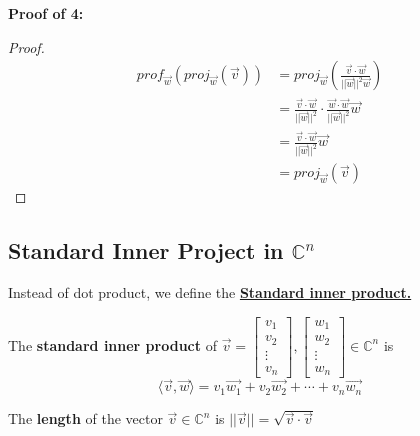 \documentclass[11pt]{article}
\theoremstyle{plain}
\theoremstyle{remark}
\theoremstyle{plain}
\newcommand{\bd}{\textbf}
\begin{document}
\bd{Proof of 4:}
\begin{proof}
\begin{align*}
    prof_{\overrightarrow{w}}(proj_{\overrightarrow{w}}(\overrightarrow{v})) &= proj_{\overrightarrow{w}}(\frac{\overrightarrow{v}\cdot\overrightarrow{w}}{||\overrightarrow{w}||^2\overrightarrow{w}}) \\
    &=\frac{\overrightarrow{v}\cdot \overrightarrow{w}}{||\overrightarrow{w}||^2}\cdot \frac{\overrightarrow{w}\cdot\overrightarrow{w}}{||\overrightarrow{w}||^2}\overrightarrow{w} \\
    &=\frac{\overrightarrow{v}\cdot\overrightarrow{w}}{||\overrightarrow{w}||^2}\overrightarrow{w} \\
    &=proj_{\overrightarrow{w}}(\overrightarrow{v})
\end{align*}
\end{proof}

\subsection*{Standard Inner Project in $\mathbb{C}^n$}
Instead of dot product, we define the \underline{\bd{Standard inner product.}}

\begin{tcolorbox}[colback=green!5!white,colframe=green!75!black,title=Definition]
    The \bd{standard inner product} of $\overrightarrow{v} = \begin{bmatrix}
        v_1\\v_2\\\vdots\\v_n
    \end{bmatrix}, \begin{bmatrix}
        w_1\\w_2\\\vdots\\w_n
    \end{bmatrix}\in \mathbb{C}^n$ is \[\langle \overrightarrow{v}, \overrightarrow{w} \rangle = v_1\overrightarrow{w_1} + v_2\overrightarrow{w_2} + \cdots + v_n\overrightarrow{w_n}\]
\end{tcolorbox}  

\begin{tcolorbox}[colback=green!5!white,colframe=green!75!black,title=Definition]
    The \bd{length} of the vector $\overrightarrow{v}\in\mathbb{C}^n$ is $||\overrightarrow{v}|| = \sqrt{\overrightarrow{v}\cdot\overrightarrow{v}}$
\end{tcolorbox} 
\end{document}
